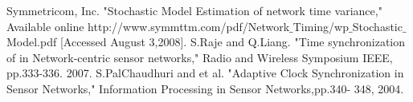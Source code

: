 \documentclass[a4paper,10pt]{report}
\begin{document}
\begin{thebibliography}{\textbf{References}}
Symmetricom, Inc. "Stochastic Model Estimation of network time variance," Available online http:\slash \slash www.symmttm.com\slash pdf\slash Network$\_$Timing\slash wp$\_$Stochastic$\_$Model.pdf [Accessed August 3,2008].
S.Raje and Q.Liang. "Time synchronization of in Network-centric sensor networks," Radio and Wireless Symposium IEEE, pp.333-336. 2007.
S.PalChaudhuri and et al. "Adaptive Clock Synchronization in Sensor Networks," Information Processing in Sensor Networks,pp.340- 348, 2004.
\end{thebibliography}
\end{document}
